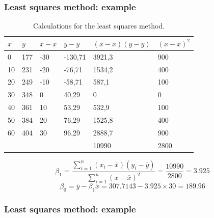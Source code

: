 \documentclass{beamer}
\begin{document}
\begin{frame}
  \frametitle{Least squares method: example}
  \begin{table}[h] \centering
    \begin{tabular}{@{}llllll@{}}
    	\toprule
    	$x$ & $y$ & $x-\overline{x}$ & $y - \overline{y}$ & $(x-\overline{x})(y - \overline{y})$ & $(x-\overline{x})^{2}$ \\ \midrule
    	0   & 177 & -30              & -130,71            & 3921,3                               & 900                    \\
    	10  & 231 & -20              & -76,71             & 1534,2                               & 400                    \\
    	20  & 249 & -10              & -58,71             & 587,1                                & 100                    \\
    	30  & 348 & 0                & 40,29              & 0                                    & 0                      \\
    	40  & 361 & 10               & 53,29              & 532,9                                & 100                    \\
    	50  & 384 & 20               & 76,29              & 1525,8                               & 400                    \\
    	60  & 404 & 30               & 96,29              & 2888,7                               & 900                    \\
    	    &     &                  &                    & 10990                                & 2800                   \\ \bottomrule
    \end{tabular}
    \caption{Calculations for the least squares method.}
    \label{tab:rendieren2}
  \end{table}
  \[ \beta_{1} = \frac{\sum_{i=1}^{n} (x_{i}-\overline{x})(y_{i} - \overline{y})}{\sum_{i=1}^{n} (x-\overline{x})^{2}} = \frac{10990}{2800} = 3.925 \]
  \[ \beta_{0} = \overline{y} - \beta_{1} \overline{x} = 307.7143 - 3.925 \times 30 = 189.96 \]
\end{frame}

\begin{frame}
  \frametitle{Least squares method: example}
  \centering
\end{frame}
\end{document}
